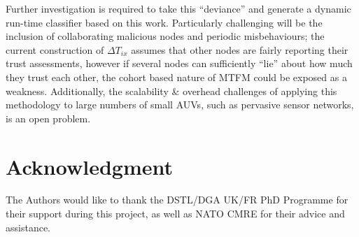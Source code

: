 \documentclass[conference]{IEEEtran}
\begin{document}
Further investigation is required to take this ``deviance'' and generate a dynamic run-time classifier based on this work. 
Particularly challenging will be the inclusion of collaborating malicious nodes and periodic misbehaviours; the current construction of $\Delta T_{ix}$ assumes that other nodes are fairly reporting their trust assessments, however if several nodes can sufficiently ``lie'' about how much they trust each other, the cohort based nature of MTFM could be exposed as a weakness.
Additionally, the scalability \& overhead challenges of applying this methodology to large numbers of small AUVs, such as pervasive sensor networks, is an open problem. 






\section*{Acknowledgment}

The Authors would like to thank the DSTL/DGA UK/FR PhD Programme for their support during this project, as well as NATO CMRE for their advice and assistance.

\balance



\end{document}
